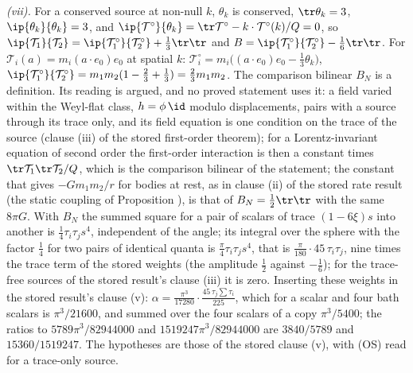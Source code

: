 \emph{(vii).} For a conserved source at non-null $k$, $\theta_{k}$ is conserved, $\tr\theta_{k} = 3$, $\ip{\theta_{k}}{\theta_{k}} = 3$, and $\ip{\mathcal{T}^{\circ}}{\theta_{k}} = \tr\mathcal{T}^{\circ} - k \cdot \mathcal{T}^{\circ}(k)/Q = 0$, so $\ip{\mathcal{T}_{1}}{\mathcal{T}_{2}} = \ip{\mathcal{T}_{1}^{\circ}}{\mathcal{T}_{2}^{\circ}} + \tfrac13\tr\tr$ and $B = \ip{\mathcal{T}_{1}^{\circ}}{\mathcal{T}_{2}^{\circ}} - \tfrac16\tr\tr$. For $\mathcal{T}_{i}(a) = m_{i}(a \cdot e_{0})e_{0}$ at spatial $k$: $\mathcal{T}^{\circ}_{i} = m_{i}\bigl((a \cdot e_{0})e_{0} - \tfrac13\theta_{k}\bigr)$, $\ip{\mathcal{T}_{1}^{\circ}}{\mathcal{T}_{2}^{\circ}} = m_{1}m_{2}(1 - \tfrac23 + \tfrac13) = \tfrac23 m_{1}m_{2}$. The comparison bilinear $B_{N}$ is a definition. Its reading is argued, and no proved statement uses it: a field varied within the Weyl-flat class, $h = \phi\,\id$ modulo displacements, pairs with a source through its trace only, and its field equation is one condition on the trace of the source (clause (iii) of the stored first-order theorem); for a Lorentz-invariant equation of second order the first-order interaction is then a constant times $\tr\mathcal{T}_{1}\tr\mathcal{T}_{2}/Q$, which is the comparison bilinear of the statement; the constant that gives $-Gm_{1}m_{2}/r$ for bodies at rest, as in clause (ii) of the stored rate result (the static coupling of Proposition ), is that of $B_{N} = \tfrac12\tr\tr$ with the same $8\pi G$. With $B_{N}$ the summed square for a pair of scalars of trace $(1 - 6\xi)s$ into another is $\tfrac14\tau_{i}\tau_{j}s^{4}$, independent of the angle; its integral over the sphere with the factor $\tfrac14$ for two pairs of identical quanta is $\tfrac{\pi}{4}\tau_{i}\tau_{j}s^{4}$, that is $\tfrac{\pi}{180}\cdot 45\,\tau_{i}\tau_{j}$, nine times the trace term of the stored weights (the amplitude $\tfrac12$ against $-\tfrac16$); for the trace-free sources of the stored result's clause (iii) it is zero. Inserting these weights in the stored result's clause (v): $\alpha = \tfrac{\pi^{3}}{17280}\cdot\tfrac{45\,\tau_{j}\sum\tau_{i}}{225}$, which for a scalar and four bath scalars is $\pi^{3}/21600$, and summed over the four scalars of a copy $\pi^{3}/5400$; the ratios to $5789\pi^{3}/82944000$ and $1519247\pi^{3}/82944000$ are $3840/5789$ and $15360/1519247$. The hypotheses are those of the stored clause (v), with (OS) read for a trace-only source.


